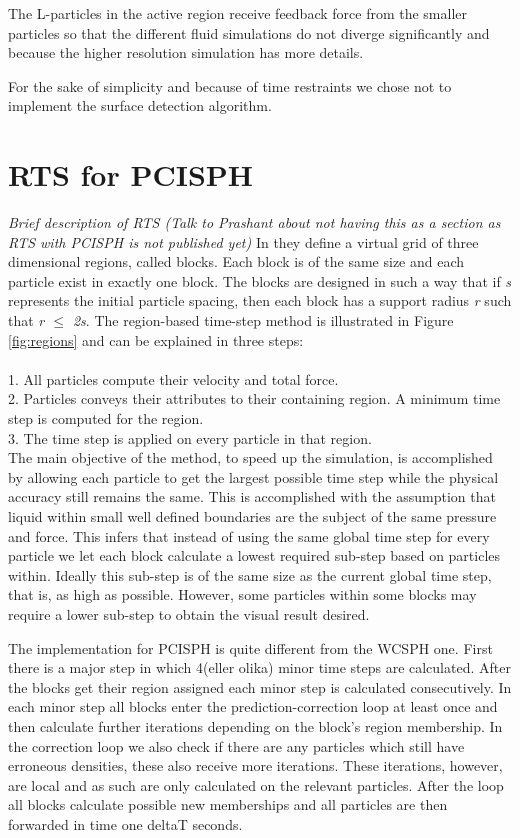 \documentclass[../../main.tex]{subfiles}
\begin{document}
The L-particles in the active region receive feedback force from the smaller particles so that the different fluid simulations do not diverge significantly and because the higher resolution simulation has more details. 

For the sake of simplicity and because of time restraints we chose not to implement the surface detection algorithm. 

\section{RTS for PCISPH}
\textit{Brief description of RTS (Talk to Prashant about not having this as a section as RTS with PCISPH is not published yet)}
In \cite{goswami2014regional} they define a virtual grid of three dimensional regions, called blocks. Each block is of the same size and each particle exist in exactly one block. The blocks are designed in such a way that if \textit{s} represents the initial particle spacing, then each block has a support radius \textit{r} such that \textit{r $\leq$ 2s}. The region-based time-step method is illustrated in Figure \ref{fig:regions} and can be explained in three steps:
\\
\\1. All particles compute their velocity and total force.
\\2. Particles conveys their attributes to their containing region. A minimum time step is computed for the region.
\\3. The time step is applied on every particle in that region. 
\\
The main objective of the method, to speed up the simulation, is accomplished by allowing each particle to get the largest possible time step while the physical accuracy still remains the same. This is accomplished with the assumption that liquid within small well defined boundaries are the subject of the same pressure and force. This infers that instead of using the same global time step for every particle we let each block calculate a lowest required sub-step based on particles within. Ideally this sub-step is of the same size as the current global time step, that is, as high as possible. However, some particles within some blocks may require a lower sub-step to obtain the visual result desired. 

The implementation for PCISPH is quite different from the WCSPH one. First there is a major step in which 4(eller olika) minor time steps are calculated. After the blocks get their region assigned each minor step is calculated consecutively. In each minor step all blocks enter the prediction-correction loop at least once and then calculate further iterations depending on the block's region membership. In the correction loop we also check if there are any particles which still have erroneous densities, these also receive more iterations. These iterations, however, are local and as such are only calculated on the relevant particles. After the loop all blocks calculate possible new memberships and all particles are then forwarded in time one deltaT seconds. 
\end{document}
